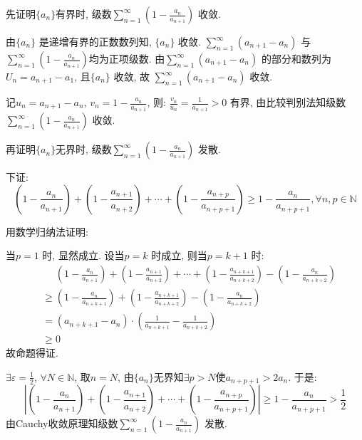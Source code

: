 \begin{solution}
    先证明\(\{a_{n}\}\)有界时,  级数\(\sum_{n=1}^{\infty} \left(1 -
    \frac{a_n}{a_{n+1}}\right)\) 收敛.

    由\(\{a_{n}\}\) 是递增有界的正数数列知, \(\{a_{n}\}\) 收敛.
    \(\sum_{n=1}^{\infty} (a_{n+1} - a_{n})\) 与\(\sum_{n=1}^{\infty} \left(1 -
    \frac{a_n}{a_{n+1}}\right)\)均为正项级数. 由\(\sum_{n=1}^{\infty}
    (a_{n+1} - a_{n})\) 的部分和数列为\(U_{n} = a_{n+1} - a_{1}\),
    且\(\{a_{n}\}\) 收敛, 故 \(\sum_{n=1}^{\infty} (a_{n+1} - a_{n})\) 收敛.

    记\(u_{n} = a_{n+1} - a_{n}\), \(v_{n} = 1 -
    \frac{a_{n}}{a_{n+1}}\), 则: \(\frac{v_{n}}{u_{n}} =
    \frac{1}{a_{n+1}} > 0\) 有界, 由比较判别法知级数\(\sum_{n=1}^{\infty} \left(1 -
    \frac{a_n}{a_{n+1}}\right)\) 收敛.

    再证明\(\{a_{n}\}\)无界时, 级数\(\sum_{n=1}^{\infty} \left(1 -
    \frac{a_n}{a_{n+1}}\right)\) 发散.

    下证: \[
        \left(1 - \frac{a_{n}}{a_{n+1}}\right) + \left(1 -
        \frac{a_{n+1}}{a_{n+2}}\right) + \cdots +
        \left(1 - \frac{a_{n+p}}{a_{n+p+1}}\right) \geq 1 -
        \frac{a_{n}}{a_{n+p+1}}, \forall n, p \in \mathbb{N}
    \]

    用数学归纳法证明:

    当\(p = 1\) 时, 显然成立.
    设当\(p = k\) 时成立, 则当\(p = k+1\) 时:
    \begin{align*}
        &\mathrel{\phantom{=}} \left(1 - \frac{a_{n}}{a_{n+1}}\right)
        + \left(1 - \frac{a_{n+1}}{a_{n+2}}\right) + \cdots + \left(1 -
        \frac{a_{n+k+1}}{a_{n+k+2}}\right) - \left(1 -
        \frac{a_{n}}{a_{n+k+2}}\right)\\
        & \geq \left(1 - \frac{a_{n}}{a_{n+k+1}}\right) + \left(1 -
        \frac{a_{n+k+1}}{a_{n+k+2}}\right) - \left(1 -
        \frac{a_{n}}{a_{n+k+2}}\right)\\
        &= \left(a_{n+k+1} - a_{n}\right) \cdot \left( \frac{1}{a_{n+k+1}} -
        \frac{1}{a_{n+k+2}} \right)\\
        & \geq 0
    \end{align*}
    故命题得证.

    \(\exists \varepsilon = \frac{1}{2}\), \(\forall N \in
    \mathbb{N}\), 取\(n = N\), 由\(\{a_{n}\}\)无界知\(\exists p >
    N\)使\(a_{n+p+1} > 2a_{n}\). 于是:
    \[
        \left| \left( 1 - \frac{a_{n}}{a_{n+1}} \right) + \left( 1 -
        \frac{a_{n+1}}{a_{n+2}} \right) + \cdots + \left( 1 -
        \frac{a_{n+p}}{a_{n+p+1}} \right)  \right| \geq 1 -
        \frac{a_{n}}{a_{n+p+1}} > \frac{1}{2}
    \]
    由Cauchy收敛原理知级数\(\sum_{n=1}^{\infty} \left(1 -
    \frac{a_n}{a_{n+1}}\right)\) 发散.
\end{solution}

